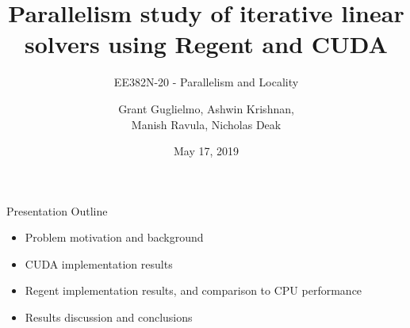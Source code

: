 \documentclass[10pt]{beamer}
\title{Parallelism study of iterative linear solvers using Regent and CUDA}
\subtitle{EE382N-20 - Parallelism and Locality}
\date{May 17, 2019}
\author{Grant Guglielmo, Ashwin Krishnan, \\Manish Ravula, Nicholas Deak}
\begin{document}

\begin{frame}
\titlepage
\end{frame}


\begin{frame}{Presentation Outline}
	
	\begin{itemize}
		
		\item Problem motivation and background
		\bigskip
		
		\item CUDA implementation results 
		\bigskip
		
		\item Regent implementation results, and comparison to CPU performance
		\bigskip
		
		\item Results discussion and conclusions
		
	\end{itemize}
	
\end{frame}
\end{document}
